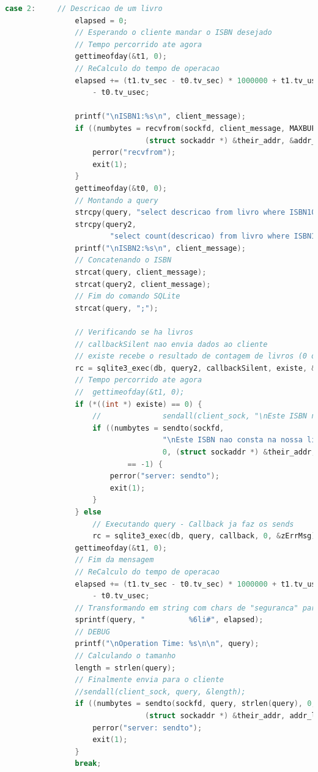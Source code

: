 \documentclass[10pt,a4paper]{report}
\begin{document}
\begin{lstlisting}[language=C]
case 2:		// Descricao de um livro
				elapsed = 0;
				// Esperando o cliente mandar o ISBN desejado
				// Tempo percorrido ate agora
				gettimeofday(&t1, 0);
				// ReCalculo do tempo de operacao
				elapsed += (t1.tv_sec - t0.tv_sec) * 1000000 + t1.tv_usec
					- t0.tv_usec;

				printf("\nISBN1:%s\n", client_message);
				if ((numbytes = recvfrom(sockfd, client_message, MAXBUFLEN - 1, 0,
								(struct sockaddr *) &their_addr, &addr_len)) == -1) {
					perror("recvfrom");
					exit(1);
				}
				gettimeofday(&t0, 0);
				// Montando a query
				strcpy(query, "select descricao from livro where ISBN10 = ");
				strcpy(query2,
						"select count(descricao) from livro where ISBN10 = ");
				printf("\nISBN2:%s\n", client_message);
				// Concatenando o ISBN
				strcat(query, client_message);
				strcat(query2, client_message);
				// Fim do comando SQLite
				strcat(query, ";");

				// Verificando se ha livros
				// callbackSilent nao envia dados ao cliente
				// existe recebe o resultado de contagem de livros (0 ou 1)
				rc = sqlite3_exec(db, query2, callbackSilent, existe, &zErrMsg);
				// Tempo percorrido ate agora
				//	gettimeofday(&t1, 0);
				if (*((int *) existe) == 0) {
					//				sendall(client_sock, "\nEste ISBN nao consta na nossa livraria!\n",&length);
					if ((numbytes = sendto(sockfd,
									"\nEste ISBN nao consta na nossa livraria!\n", 42,
									0, (struct sockaddr *) &their_addr, addr_len))
							== -1) {
						perror("server: sendto");
						exit(1);
					}
				} else
					// Executando query - Callback ja faz os sends
					rc = sqlite3_exec(db, query, callback, 0, &zErrMsg);
				gettimeofday(&t1, 0);
				// Fim da mensagem
				// ReCalculo do tempo de operacao
				elapsed += (t1.tv_sec - t0.tv_sec) * 1000000 + t1.tv_usec
					- t0.tv_usec;
				// Transformando em string com chars de "seguranca" para postumo atoi
				sprintf(query, "          %6li#", elapsed);
				// DEBUG
				printf("\nOperation Time: %s\n\n", query);
				// Calculando o tamanho
				length = strlen(query);
				// Finalmente envia para o cliente
				//sendall(client_sock, query, &length);
				if ((numbytes = sendto(sockfd, query, strlen(query), 0,
								(struct sockaddr *) &their_addr, addr_len)) == -1) {
					perror("server: sendto");
					exit(1);
				}
				break;
\end{lstlisting}
\end{document}
